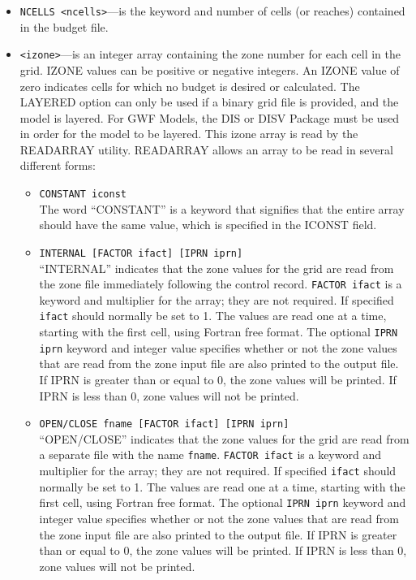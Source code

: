 \documentclass[11pt,twoside,twocolumn]{usgsreport}
\begin{document}
\begin{itemize}
\item \texttt{NCELLS <ncells>}---is the keyword and number of cells (or reaches) contained in the budget file.
\item \texttt{<izone>}---is an integer array containing the zone number for each cell in the grid.  IZONE values can be positive or negative integers. An IZONE value of zero indicates cells for which no budget is desired or calculated. The LAYERED option can only be used if a binary grid file is provided, and the model is layered.  For GWF Models, the DIS or DISV Package must be used in order for the model to be layered.  This izone array is read by the READARRAY utility.  READARRAY allows an array to be read in several different forms:

\begin{itemize}

\item \texttt{CONSTANT iconst} \\
The word ``CONSTANT'' is a keyword that signifies that the entire array should have the same
value, which is specified in the ICONST field. 
 
\item \texttt{INTERNAL [FACTOR ifact] [IPRN iprn]} \\
``INTERNAL'' indicates that the zone values for the grid are read from the zone file immediately following the control record. \texttt{FACTOR ifact} is a keyword and multiplier for the array; they are not required.  If specified \texttt{ifact} should normally be set to 1.  The values are read one at a time, starting with the first cell, using Fortran free format.  The optional \texttt{IPRN iprn} keyword and integer value specifies whether or not the zone values that are read from the zone input file are also printed to the output file. If IPRN is greater than or equal to 0, the zone values will be printed. If IPRN is less than 0, zone values will not be printed. 

\item \texttt{OPEN/CLOSE fname [FACTOR ifact] [IPRN iprn]} \\
``OPEN/CLOSE'' indicates that the zone values for the grid are read from a separate file with the name \texttt{fname}. \texttt{FACTOR ifact} is a keyword and multiplier for the array; they are not required.  If specified \texttt{ifact} should normally be set to 1.  The values are read one at a time, starting with the first cell, using Fortran free format.  The optional \texttt{IPRN iprn} keyword and integer value specifies whether or not the zone values that are read from the zone input file are also printed to the output file. If IPRN is greater than or equal to 0, the zone values will be printed. If IPRN is less than 0, zone values will not be printed.

\end{itemize}

\end{itemize}
\end{document}
